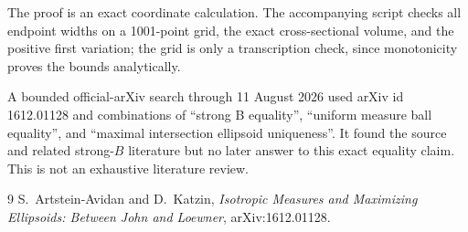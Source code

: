 \documentclass[11pt]{article}
\begin{document}
The proof is an exact coordinate calculation.  The accompanying script
checks all endpoint widths on a 1001-point grid, the exact cross-sectional
volume, and the positive first variation; the grid is only a transcription
check, since monotonicity proves the bounds analytically.

A bounded official-arXiv search through 11 August 2026 used arXiv id
1612.01128 and combinations of ``strong B equality'', ``uniform measure
ball equality'', and ``maximal intersection ellipsoid uniqueness''.  It
found the source and related strong-\(B\) literature but no later answer to
this exact equality claim.  This is not an exhaustive literature review.

\begin{thebibliography}{9}
S.~Artstein-Avidan and D.~Katzin,
\emph{Isotropic Measures and Maximizing Ellipsoids: Between John and
Loewner}, arXiv:1612.01128.
\end{thebibliography}
\end{document}
